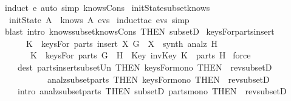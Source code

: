 \begin{isabellebody}
  \isadelimproof
  \endisadelimproof
  \isatagproof
  \isamarkupfalse%
  \ {\isacharparenleft}induct\ e{\isacharcomma}\ auto\ simp{\isacharcolon}\ knows{\isacharunderscore}Cons{\isacharparenright}%
  \endisatagproof
  {\isafoldproof}%
  \isadelimproof
  \isanewline
  \endisadelimproof
  \isanewline
  \isamarkupfalse%
  \ initState{\isacharunderscore}subset{\isacharunderscore}knows\ {\isacharcolon}\isanewline
  \ \ {\isachardoublequoteopen}initState\ A\ {\isasymsubseteq}\ knows\ A\ evs{\isachardoublequoteclose}\isanewline
  \isadelimproof
  \endisadelimproof
  \isatagproof
  \isamarkupfalse%
  \ {\isacharparenleft}induct{\isacharunderscore}tac\ evs{\isacharcomma}\ simp{\isacharparenright}\isanewline
  \isamarkupfalse%
  \ {\isacharparenleft}blast\ intro{\isacharcolon}\ knows{\isacharunderscore}subset{\isacharunderscore}knows{\isacharunderscore}Cons\ {\isacharbrackleft}THEN\ subsetD{\isacharbrackright}{\isacharparenright}\isanewline
  \isamarkupfalse%
  \endisatagproof
  {\isafoldproof}%
  \isadelimproof
  \isanewline
  \endisadelimproof
  \isanewline
  \isamarkupfalse%
  \ keysFor{\isacharunderscore}parts{\isacharunderscore}insert{\isacharcolon}\isanewline
  \ \ \ \ \ {\isachardoublequoteopen}{\isasymlbrakk}\ K\ {\isasymin}\ keysFor\ {\isacharparenleft}parts\ {\isacharparenleft}insert\ X\ G{\isacharparenright}{\isacharparenright}{\isacharsemicolon}\ \ X\ {\isasymin}\ synth\ {\isacharparenleft}analz\ H{\isacharparenright}\ {\isasymrbrakk}\isanewline
  \ \ \ \ \ \ {\isasymLongrightarrow}\ K\ {\isasymin}\ keysFor\ {\isacharparenleft}parts\ {\isacharparenleft}G\ {\isasymunion}\ H{\isacharparenright}{\isacharparenright}\ {\isasymor}\ Key\ {\isacharparenleft}invKey\ K{\isacharparenright}\ {\isasymin}\ parts\ H{\isachardoublequoteclose}\isanewline
  \isadelimproof
  \endisadelimproof
  \isatagproof
  \isamarkupfalse%
  \ {\isacharparenleft}force\isanewline
  \ \ \ \ dest{\isacharbang}{\isacharcolon}\ parts{\isacharunderscore}insert{\isacharunderscore}subset{\isacharunderscore}Un\ {\isacharbrackleft}THEN\ keysFor{\isacharunderscore}mono{\isacharcomma}\ THEN\ {\isacharbrackleft}{}{\isacharbrackright}\ rev{\isacharunderscore}subsetD{\isacharbrackright}\isanewline
  \ \ \ \ \ \ \ \ \ \ \ analz{\isacharunderscore}subset{\isacharunderscore}parts\ {\isacharbrackleft}THEN\ keysFor{\isacharunderscore}mono{\isacharcomma}\ THEN\ {\isacharbrackleft}{}{\isacharbrackright}\ rev{\isacharunderscore}subsetD{\isacharbrackright}\isanewline
  \ \ \ \ intro{\isacharcolon}\ analz{\isacharunderscore}subset{\isacharunderscore}parts\ {\isacharbrackleft}THEN\ subsetD{\isacharbrackright}\ parts{\isacharunderscore}mono\ {\isacharbrackleft}THEN\ {\isacharbrackleft}{}{\isacharbrackright}\ rev{\isacharunderscore}subsetD{\isacharbrackright}{\isacharparenright}%
  \endisatagproof
  {\isafoldproof}%
  \isadelimproof
  \isanewline
  \endisadelimproof
  \isadelimtheory
  \isanewline
  \endisadelimtheory
  \isatagtheory
  \isamarkupfalse%
  \endisatagtheory
  {\isafoldtheory}%
  \isadelimtheory
  \endisadelimtheory
  \end{isabellebody}%
